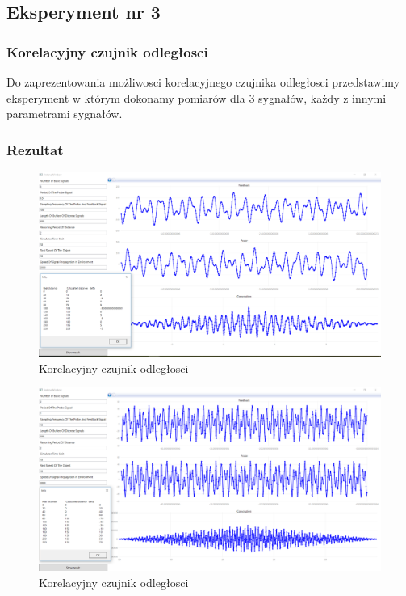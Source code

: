 \documentclass[12pt]{article}
\begin{document}




\subsection{Eksperyment nr 3 }
\subsubsection{Korelacyjny czujnik odległosci}
Do zaprezentowania możliwosci korelacyjnego czujnika odległosci przedstawimy eksperyment w którym dokonamy pomiarów dla 3 sygnałów, każdy z innymi parametrami sygnałów.


\subsubsection{Rezultat}

\begin{figure}[H]
 \centering
 \includegraphics[width=14cm]{images/a1.PNG}
 \vspace{-0.3cm}
 \caption{Korelacyjny czujnik odległosci}
 \label{gui}
\end{figure}

\begin{figure}[H]
 \centering
 \includegraphics[width=14cm]{images/a2.PNG}
 \vspace{-0.3cm}
 \caption{Korelacyjny czujnik odległosci}
 \label{gui}
\end{figure}
\end{document}
